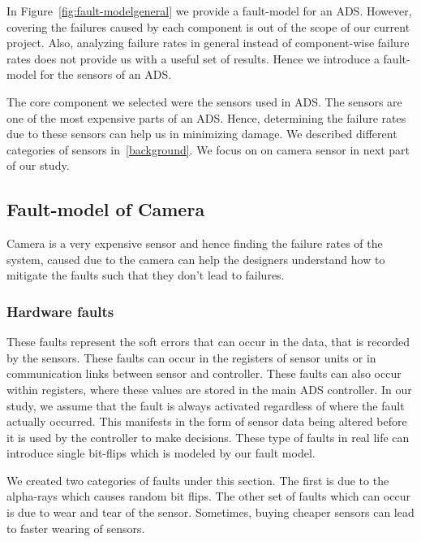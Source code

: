In Figure~\ref{fig:fault-modelgeneral} we provide a fault-model for an ADS. However, covering the failures caused by each component is out of the scope of our current project. Also, analyzing failure rates in general instead of component-wise failure rates does not provide us with a useful set of results. Hence we introduce a fault-model for the sensors of an ADS. 

 The core component we selected were the  sensors used in ADS. The sensors are one of the most expensive parts of an ADS. Hence, determining the failure rates due to these sensors can help us in minimizing damage. We described different categories of sensors in~\ref{background}. We focus on on camera sensor in next part of our study.
 
 \subsection{Fault-model of Camera}
Camera is a very expensive sensor and hence finding the failure rates of the system, caused due to the camera can help the designers understand how to mitigate the faults such that they don't lead to failures.
 
 \subsubsection{Hardware faults} 
These faults represent the soft errors that can occur in the data, that is recorded by the sensors. These faults can occur in the registers of sensor units or in communication links between sensor and controller. These faults can also occur within registers, where these values are stored in the main ADS controller. In our study, we assume that the fault is always activated regardless of where the fault actually occurred. This manifests in the form of sensor data being altered before it is used by the controller to make decisions. These type of faults in real life can introduce single bit-flips which is modeled by our fault model. 

We created two categories of faults under this section. The first is due to the alpha-rays which causes random bit flips. The other set of faults which can occur is due to wear and tear of the sensor. Sometimes, buying cheaper sensors can lead to faster wearing of sensors.

 \medskip

